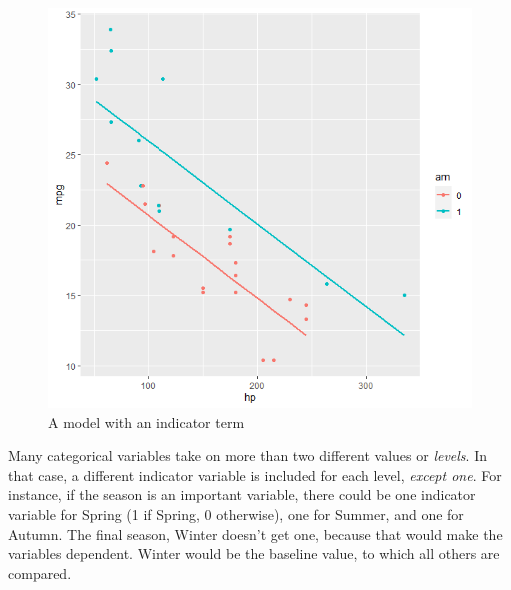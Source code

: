 \documentclass[
]{book}
\theoremstyle{definition}
\theoremstyle{definition}
\theoremstyle{definition}
\theoremstyle{definition}
\theoremstyle{remark}
\begin{document}
\begin{figure}

{\centering \includegraphics[width=0.75\linewidth]{images/multiint} 

}

\caption{A model with an indicator term}\label{fig:indicator}
\end{figure}

Many categorical variables take on more than two different values or \emph{levels}. In that case, a different indicator variable is included for each level, \emph{except one}. For instance, if the season is an important variable, there could be one indicator variable for Spring (1 if Spring, 0 otherwise), one for Summer, and one for Autumn. The final season, Winter doesn't get one, because that would make the variables dependent. Winter would be the baseline value, to which all others are compared.
\end{document}
